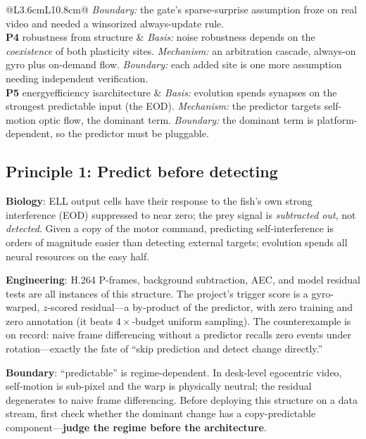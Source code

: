 \documentclass[12pt,a4paper]{article}
\begin{document}
\begin{table}[htbp]
\begin{tabular}{@{}L{3.6cm}L{10.8cm}@{}}
      \emph{Boundary:} the gate's sparse-surprise assumption froze on real video and needed a winsorized always-update rule. \\
    \addlinespace[2pt]
    \textbf{P4} robustness from structure &
      \emph{Basis:} noise robustness depends on the \emph{coexistence} of both plasticity sites.
      \emph{Mechanism:} an arbitration cascade, always-on gyro plus on-demand flow.
      \emph{Boundary:} each added site is one more assumption needing independent verification. \\
    \addlinespace[2pt]
    \textbf{P5} energy\newline efficiency is\newline architecture &
      \emph{Basis:} evolution spends synapses on the strongest predictable input (the EOD).
      \emph{Mechanism:} the predictor targets self-motion optic flow, the dominant term.
      \emph{Boundary:} the dominant term is platform-dependent, so the predictor must be pluggable. \\
    \bottomrule
  \end{tabular}
\end{table}

\subsection{Principle 1: Predict before detecting}

\textbf{Biology}: ELL output cells have their response to the fish's own strong interference (EOD) suppressed to near zero; the prey signal is \emph{subtracted out}, not \emph{detected}. Given a copy of the motor command, predicting self-interference is orders of magnitude easier than detecting external targets; evolution spends all neural resources on the easy half.

\textbf{Engineering}: H.264 P-frames, background subtraction, AEC, and model residual tests are all instances of this structure. The project's trigger score is a gyro-warped, $z$-scored residual---a by-product of the predictor, with zero training and zero annotation (it beats $4\times$-budget uniform sampling). The counterexample is on record: naive frame differencing without a predictor recalls zero events under rotation---exactly the fate of ``skip prediction and detect change directly.''

\textbf{Boundary}: ``predictable'' is regime-dependent. In desk-level egocentric video, self-motion is sub-pixel and the warp is physically neutral; the residual degenerates to naive frame differencing. Before deploying this structure on a data stream, first check whether the dominant change has a copy-predictable component---\textbf{judge the regime before the architecture}.
\end{document}
